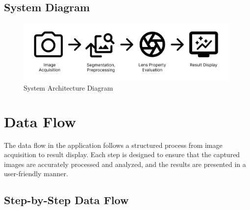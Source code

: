 \subsection{System Diagram}

\begin{figure}[h]
\centering
\includegraphics[width=0.99\textwidth]{Images/architecture_diagram.png}
\caption{System Architecture Diagram}
\label{fig:system_architecture}
\end{figure}

\section{Data Flow}

The data flow in the application follows a structured process from image acquisition to result display. Each step is designed to ensure that the captured images are accurately processed and analyzed, and the results are presented in a user-friendly manner.

\subsection{Step-by-Step Data Flow}


